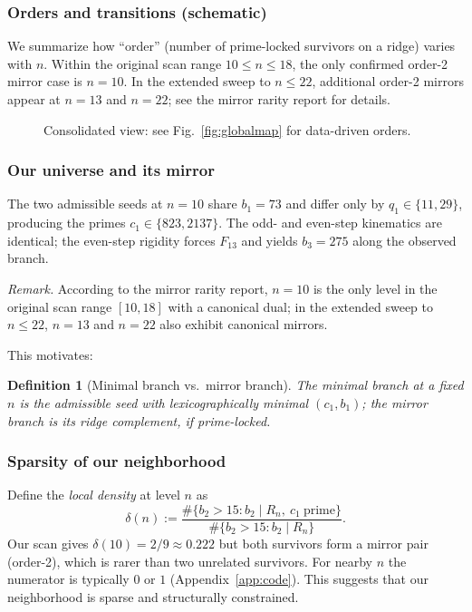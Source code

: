 \documentclass[12pt]{article}
\newtheorem{definition}[theorem]{Definition}
\numberwithin{equation}{section}
\begin{document}
\subsubsection{Orders and transitions (schematic)}\label{subsec:orders-transitions}
We summarize how ``order'' (number of prime-locked survivors on a ridge) varies with $n$. Within the original scan range $10 \le n \le 18$, the only confirmed order-2 mirror case is $n=10$. In the extended sweep to $n \le 22$, additional order-2 mirrors appear at $n=13$ and $n=22$; see the mirror rarity report for details.

\begin{figure}[h]
\centering
{}
\caption{Consolidated view: see Fig.~\ref{fig:globalmap} for data-driven orders.}
\label{fig:orders-transitions}
\end{figure}

\subsubsection{Our universe and its mirror}\label{subsec:universe-mirror}
The two admissible seeds at $n=10$ share $b_1=73$ and differ only by $q_1\in\{11,29\}$, producing the primes $c_1\in\{823,2137\}$. The odd- and even-step kinematics are identical; the even-step rigidity forces $F_{13}$ and yields $b_3=275$ along the observed branch.

\textit{Remark.} According to the mirror rarity report, $n=10$ is the only level in the original scan range $[10,18]$ with a canonical dual; in the extended sweep to $n \le 22$, $n=13$ and $n=22$ also exhibit canonical mirrors.

This motivates:
\begin{definition}[Minimal branch vs.\ mirror branch]\label{def:minimal-branch}
The \emph{minimal branch} at a fixed $n$ is the admissible seed with lexicographically minimal $(c_1,b_1)$; the \emph{mirror branch} is its ridge complement, if prime-locked.
\end{definition}

\subsubsection{Sparsity of our neighborhood}\label{subsec:sparsity}
Define the \emph{local density} at level $n$ as
\[
\delta(n):=\frac{\#\{b_2>15: b_2\mid R_n,\ c_1\ \text{prime}\}}{\#\{b_2>15: b_2\mid R_n\}}.
\]
Our scan gives $\delta(10)=2/9\approx 0.222$ but both survivors form a mirror pair (order-2), which is rarer than two unrelated survivors. For nearby $n$ the numerator is typically $0$ or $1$ (Appendix~\ref{app:code}). This suggests that our neighborhood is sparse and structurally constrained.
\end{document}
